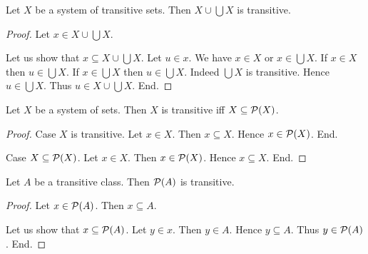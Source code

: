 \documentclass[10pt]{article}
\begin{document}
  \begin{forthel}
    \begin{proposition}
      Let $X$ be a system of transitive sets.
      Then $X \cup \bigcup X$ is transitive.
    \end{proposition}
    \begin{proof}
      Let $x \in X \cup \bigcup X$.

      Let us show that $x \subseteq X \cup \bigcup X$.
        Let $u \in x$.
        We have $x \in X$ or $x \in \bigcup X$.
        If $x \in X$then $u \in \bigcup X$.
        If $x \in \bigcup X$ then $u \in \bigcup X$.
        Indeed $\bigcup X$ is transitive.
        Hence $u \in \bigcup X$.
        Thus $u \in X \cup \bigcup X$.
      End.
    \end{proof}
  \end{forthel}

  \begin{forthel}
    \begin{proposition}
      Let $X$ be a system of sets.
      Then $X$ is transitive iff $X \subseteq \mathcal{P}(X)$.
    \end{proposition}
    \begin{proof}
      Case $X$ is transitive.
        Let $x \in X$.
        Then $x \subseteq X$.
        Hence $x \in \mathcal{P}(X)$.
      End.

      Case $X \subseteq \mathcal{P}(X)$.
        Let $x \in X$.
        Then $x \in \mathcal{P}(X)$.
        Hence $x \subseteq X$.
      End.
    \end{proof}
  \end{forthel}

  \begin{forthel}
    \begin{proposition}
      Let $A$ be a transitive class.
      Then $\mathcal{P}(A)$ is transitive.
    \end{proposition}
    \begin{proof}
      Let $x \in \mathcal{P}(A)$.
      Then $x \subseteq A$.

      Let us show that $x \subseteq \mathcal{P}(A)$.
        Let $y \in x$.
        Then $y \in A$.
        Hence $y \subseteq A$.
        Thus $y \in \mathcal{P}(A)$.
      End.
    \end{proof}
  \end{forthel}
\end{document}
